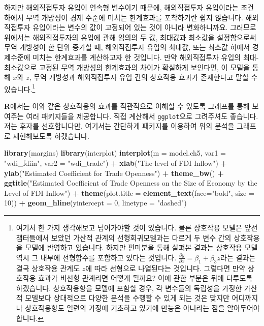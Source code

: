 \documentclass[
]{book}
\newenvironment{Shaded}{\begin{snugshade}}{\end{snugshade}}
\newcommand{\DataTypeTok}[1]{\textcolor[rgb]{0.13,0.29,0.53}{#1}}
\newcommand{\DecValTok}[1]{\textcolor[rgb]{0.00,0.00,0.81}{#1}}
\newcommand{\KeywordTok}[1]{\textcolor[rgb]{0.13,0.29,0.53}{\textbf{#1}}}
\newcommand{\NormalTok}[1]{#1}
\newcommand{\OperatorTok}[1]{\textcolor[rgb]{0.81,0.36,0.00}{\textbf{#1}}}
\newcommand{\StringTok}[1]{\textcolor[rgb]{0.31,0.60,0.02}{#1}}
\begin{document}
하지만 해외직접투자 유입이 연속형 변수이기 때문에, 해외직접투자 유입이라는 조건 하에서 무역 개방성이 경제 수준에 미치는 한계효과를 포착하기란 쉽지 않습니다. 해외직접투자 유입이라는 변수의 값이 고정되어 있는 것이 아니라 변화하니까요. 그러므로 위에서는 해외직접투자의 유입에 관해 임의의 두 값, 최대값과 최소값을 설정함으로써 무역 개방성이 한 단위 증가할 때, 해외직접투자 유입의 최대값, 또는 최소값 하에서 경제수준에 미치는 한계효과를 계산하고자 한 것입니다. 만약 해외직접투자 유입의 최대-최소값으로 고정된 무역 개방성의 한계효과의 차이가 확실하게 보인다면, 이 모델을 통해 \(x\)와 \(z\), 무역 개방성과 해외직접투자 유입 간의 상호작용 효과가 존재한다고 말할 수 있습니다.\footnote{여기서 한 가지 생각해보고 넘어가야할 것이 있습니다. 물론 상호작용 모델은 앞선 챕터들에서 보았던 가산적 관계의 선형회귀모델과는 다르게 두 변수 간의 상호작용을 모델에 반영하고 있습니다. 하지만 편미분을 통해 살펴본 결과는 상호작용 모델 역시 그 내부에 선형함수를 포함하고 있다는 것입니다. \(\frac{\partial y}{\partial x} = \beta_1 + \beta_3 z\)라는 결과는 결국 상호작용 관계도 \(z\)에 따라 선형으로 나열된다는 것입니다. 그렇다면 만약 상호작용 효과가 비선형 관계라면 어떻게 될까요? 이에 관한 부분은 뒤에 다루도록 하겠습니다. 상호작용항을 모델에 포함할 경우, 각 변수들의 독립성을 가정한 가산적 모델보다 상대적으로 다양한 분석을 수행할 수 있게 되는 것은 맞지만 어디까지나 상호작용항도 일련의 가정에 기초하고 있기에 만능은 아니라는 점을 알아두어야 합니다.}

\textbf{R}에서는 이와 같은 상호작용의 효과를 직관적으로 이해할 수 있도록 그래프를 통해 보여주는 여러 패키지들을 제공합니다. 직접 계산해서 \texttt{ggplot}으로 그려주셔도 좋습니다. 저는 후자를 선호합니다만, 여기서는 간단하게 패키지를 이용하여 위의 분석을 그래프로 재현해보도록 하겠습니다.

\begin{Shaded}
\begin{Highlighting}[]
\KeywordTok{library}\NormalTok{(margins)}
\KeywordTok{library}\NormalTok{(interplot)}
\KeywordTok{interplot}\NormalTok{(}\DataTypeTok{m =}\NormalTok{ model.ch5, }
          \DataTypeTok{var1 =} \StringTok{"wdi_fdiin"}\NormalTok{, }
          \DataTypeTok{var2 =} \StringTok{"wdi_trade"}\NormalTok{) }\OperatorTok{+}
\StringTok{  }\KeywordTok{xlab}\NormalTok{(}\StringTok{"The level of FDI Inflow"}\NormalTok{) }\OperatorTok{+}
\StringTok{  }\KeywordTok{ylab}\NormalTok{(}\StringTok{"Estimated Coefficient for Trade Openness"}\NormalTok{) }\OperatorTok{+}
\StringTok{  }\KeywordTok{theme_bw}\NormalTok{() }\OperatorTok{+}
\StringTok{  }\KeywordTok{ggtitle}\NormalTok{(}\StringTok{"Estimated Coefficient of Trade Openness on the Size of Economy}
\StringTok{          by the Level of FDI Inflow"}\NormalTok{) }\OperatorTok{+}
\StringTok{  }\KeywordTok{theme}\NormalTok{(}\DataTypeTok{plot.title =} \KeywordTok{element_text}\NormalTok{(}\DataTypeTok{face=}\StringTok{"bold"}\NormalTok{, }\DataTypeTok{size =} \DecValTok{10}\NormalTok{)) }\OperatorTok{+}
\StringTok{  }\KeywordTok{geom_hline}\NormalTok{(}\DataTypeTok{yintercept =} \DecValTok{0}\NormalTok{, }\DataTypeTok{linetype =} \StringTok{"dashed"}\NormalTok{)}
\end{Highlighting}
\end{Shaded}
\end{document}
